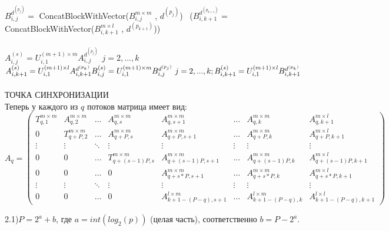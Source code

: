 \documentclass[a4paper,12pt]{article}
\begin{document}
$B_{i,j}^{d^{(p_{j})}} = $ ConcatBlockWithVector($B_{i,j}^{m\times m}$ , $d^{(p_{j})}$) \ 
($B_{i,k+1}^{d^{(p_{k+1})}} = $   ConcatBlockWithVector($B_{i,k+1}^{m\times l}$ , $d^{(p_{k+1})}$))\\\\
$A_{i,j}^{(s)} = U_{i,1}^{(m+1)\times m} A_{i,j}^{d^{(p_{j})}} \ \ j = 2,...,k$ $A_{i,k+1}^{(s)} = U_{i,1}^{(m+1)\times l} A_{i, k+1}^{d^{(p_{k})}} \\ B_{i,j}^{(s)} = U_{i,1}^{(m+1)\times m} B_{i,j}^{d^{(p_{j})}} \  j = 2,...,k ;  B_{i,k+1}^{(s)} = U_{i,1}^{(m+1)\times l} B_{i, k+1}^{d^{(p_{k})}} $\\
\\{\fontseries{bx}\fontsize{10}{10}\selectfont ТОЧКА СИНХРОНИЗАЦИИ}\\
Теперь у каждого из $q$ потоков матрица имеет вид:
$$A_{q}=
   \begin{pmatrix}
     T_{q,1}^{m\times m}& A_{q,2}^{m\times m} &\dots & A_{q,s}^{m \times m} &  A_{q,s+1}^{m \times m}& \dots& A_{q,k}^{m\times m} & A_{q,k+1}^{m\times l}\\
     
     0& T_{q+P,2}^{m\times m} &\ldots & A_{q+P,s}^{m \times m} &  A_{q+P,s+1}^{m \times m}& \dots& A_{q+P,k}^{m\times m} & A_{q+P,k+1}^{m\times l} \\
     
     \vdots& \vdots &\ddots & \vdots & \vdots & \vdots & \vdots & \vdots  \\
     
     0& 0 &\ldots & T_{q+(s-1)P,s}^{m \times m} &  A_{q+(s-1)P,s+1}^{m \times m}& \dots& A_{q+(s-1)P,k}^{m\times m} & A_{q+(s-1)P,k+1}^{m\times l}\\

     0& 0 &\ldots & 0 &  A_{q+s*P,s+1}^{m \times m}& \dots& A_{q+s*P,k}^{m\times m} & A_{q+s*P,k+1}^{m\times l}\\

    \vdots& \vdots &\ddots & \vdots & \vdots & \vdots & \vdots & \vdots  \\

    0& 0 &\ldots & 0&  A_{k+1-(P-q),s+1}^{l \times m}& \dots& A_{k+1-(P-q),k}^{l\times m} & A_{k+1-(P-q),k+1}^{l\times l}
    \end{pmatrix}
$$ 


2.1)$P = 2^{a} + b$, где $a = int(log_{2}(p))$ (целая часть), соответственно $b = P-2^a$.
\end{document}
